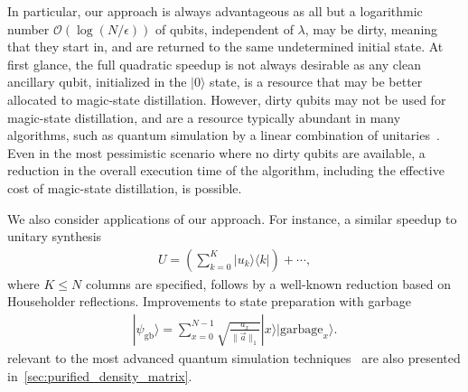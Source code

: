 \documentclass[a4paper,onecolumn,10pt,accepted=2024-05-22]{quantumarticle}
\newcommand{\ket}[1]{| #1\rangle}        %
\newcommand{\bra}[1]{\langle #1|}        %
\begin{document}
	
	In particular, our approach is always advantageous as all but a logarithmic number $\mathcal{O}(\log{(N/\epsilon)})$ of qubits, independent of $\lambda$, may be dirty, meaning that they start in, and are returned to the same undetermined initial state. At first glance, the full quadratic speedup is not always desirable as any clean ancillary qubit, initialized in the $\ket{0}$ state, is a resource that may be better allocated to magic-state distillation. However, dirty qubits may not be used for magic-state distillation, and are a resource typically abundant in many algorithms, such as quantum simulation by a linear combination of unitaries~\cite{Berry2015Truncated}. Even in the most pessimistic scenario where no dirty qubits are available, a reduction in the overall execution time of the algorithm, including the effective cost of magic-state distillation, is possible.
	
	We also consider applications of our approach. For instance, a similar speedup to unitary synthesis 
	\begin{align}
	\label{eq:unitary_synthesis}
	U=\left(\sum^K_{k=0}\ket{u_k}\bra{k}\right)+\cdots,
	\end{align}
	where $K\le N$ columns are specified, follows by a well-known reduction based on Householder reflections. Improvements to state preparation with garbage
	\begin{align}
	\label{eq:state_prep_garbage}
	\ket{\psi_\textrm{gb}}=\sum_{x=0}^{N-1} \sqrt{\frac{a_x}{\|\vec{a}\|_1}} \ket{x}\ket{\mathrm{garbage}_x}.
	\end{align}
	relevant to the most advanced quantum simulation techniques~\cite{Low2016Qubitization,Low2017USA,Babbush2018encoding} are also presented in~\cref{sec:purified_density_matrix}.
	
\end{document}
